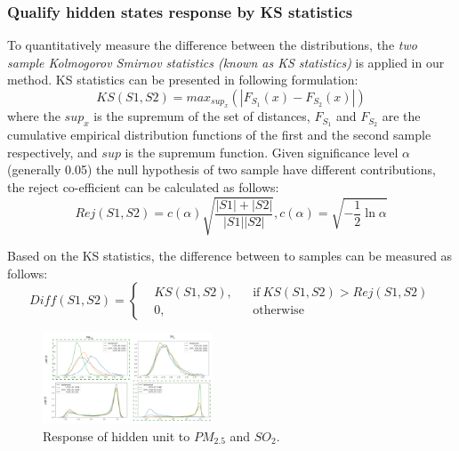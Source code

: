 \subsubsection{Qualify hidden states response by KS statistics}
To quantitatively measure the difference between the distributions, the \textit{two sample Kolmogorov Smirnov statistics (known as KS statistics) }is applied in our method. 
KS statistics can be presented in following formulation:
\begin{equation} 
KS(S1, S2) = max_{sup_x}(|F_{S_1}(x) - F_{S_2}(x)|)
\end{equation}
where the $sup_x$ is the supremum of the set of distances, $F_{S_1}$ and $F_{S_2}$ are the cumulative empirical distribution functions of the first and the second sample respectively, and $sup$ is the supremum function.
Given significance level $\alpha$(generally 0.05) the null hypothesis of two sample have different contributions, the reject co-efficient can be calculated as follows:
\begin{equation} 
Rej(S1, S2) = c(\alpha)\sqrt{\frac{|S1| + |S2|}{|S1||S2|}},  c(\alpha) = \sqrt{-\frac{1}{2}\ln\alpha }
\end{equation}

Based on the KS statistics, the difference between to samples can be measured as follows:
\begin{equation} 
Diff(S1, S2) = \left \{
  \begin{aligned}
    &KS(S1, S2), && \text{if}\ KS(S1, S2) > Rej(S1, S2)\\
    &0, && \text{otherwise}
  \end{aligned} \right.
\end{equation}




\begin{figure}[t]
	\centering
	\includegraphics[width=0.45\textwidth]{pictures/unit_response_kdeplot.pdf}
	\vspace{-3mm}
	\caption{Response of hidden unit to $PM_{2.5}$ and $SO_2$.}
	\label{fig:unit_distribution_subgroup}
	\vspace{-4mm}
\end{figure}


